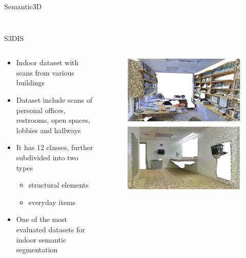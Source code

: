 \documentclass[aspectratio=169]{beamer}
\begin{document}
\begin{frame}{Semantic3D}
\begin{columns}
\begin{column}{0.33\textwidth}
\begin{figure}
            \end{figure}
        \end{column}
    \end{columns}
\end{frame}
\begin{frame}{S3DIS}
    \begin{columns}
        \begin{column}{0.6\textwidth}
            \begin{itemize}
                \item Indoor dataset with scans from various buildings
                \item Dataset include scans of personal offices, restrooms, open spaces, lobbies and hallways
                \item It has 12 classes, further subdivided into two types
                \begin{itemize}
                    \item structural elements 
                    \item everyday items
                \end{itemize}
                \item One of the most evaluated datasets for indoor semantic segmentation
            \end{itemize}
        \end{column}
        \begin{column}{0.4\textwidth}
            \begin{figure}
                \centering
                \includegraphics[scale=0.35]{images/s3dis/s3dis_sample_1.jpg}
                \includegraphics[scale=0.35]{images/s3dis/s3dis_sample_2.jpg}

\end{figure}
\end{column}
\end{columns}
\end{frame}
\end{document}

